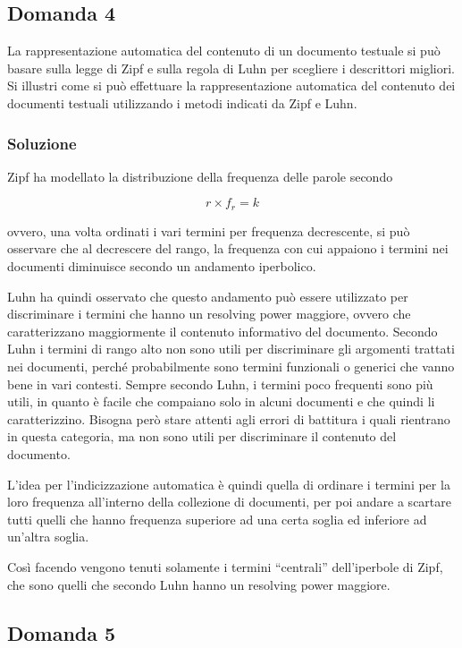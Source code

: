 \subsection{Domanda 4}

La rappresentazione automatica del contenuto di un documento testuale si può basare sulla legge di Zipf e sulla regola di Luhn per scegliere i descrittori migliori. Si illustri come si può effettuare la rappresentazione automatica del contenuto dei documenti testuali utilizzando i metodi indicati da Zipf e Luhn.

\subsubsection{Soluzione}

Zipf ha modellato la distribuzione della frequenza delle parole secondo

$$
r \times f_r = k
$$

ovvero, una volta ordinati i vari termini per frequenza decrescente, si può osservare che al decrescere del rango, la frequenza con cui appaiono i termini nei documenti diminuisce secondo un andamento iperbolico.

Luhn ha quindi osservato che questo andamento può essere utilizzato per discriminare i termini che hanno un resolving power maggiore, ovvero che caratterizzano maggiormente il contenuto informativo del documento. Secondo Luhn i termini di rango alto non sono utili per discriminare gli argomenti trattati nei documenti, perché probabilmente sono termini funzionali o generici che vanno bene in vari contesti. Sempre secondo Luhn,  i termini poco frequenti sono più utili, in quanto è facile che compaiano solo in alcuni documenti e che quindi li caratterizzino. Bisogna però stare attenti agli errori di battitura i quali rientrano in questa categoria, ma non sono utili per discriminare il contenuto del documento.

L'idea per l'indicizzazione automatica è quindi quella di ordinare i termini per la loro frequenza all'interno della collezione di documenti, per poi andare a scartare tutti quelli che hanno frequenza superiore ad una certa soglia ed inferiore ad un'altra soglia.

Così facendo vengono tenuti solamente i termini ``centrali'' dell'iperbole di Zipf, che sono quelli che secondo Luhn hanno un resolving power maggiore. 

\subsection{Domanda 5}

